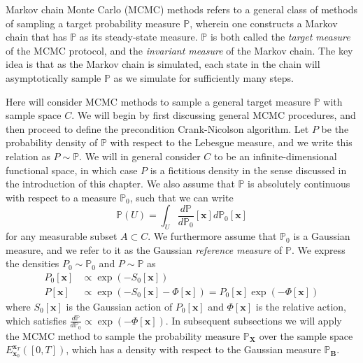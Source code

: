 Markov chain Monte Carlo (MCMC) methods refers to a general class of methods of sampling a target probability measure $\mathbb{P}$, wherein one constructs a Markov chain that has $\mathbb{P}$ as its steady-state measure. $\mathbb{P}$ is both called the \textit{target measure} of the MCMC protocol, and the \textit{invariant measure} of the Markov chain. The key idea is that as the Markov chain is simulated, each state in the chain will asymptotically sample $\mathbb{P}$ as we simulate for sufficiently many steps.

Here will consider MCMC methods to sample a general target measure $\mathbb{P}$ with sample space $C$. We will begin by first discussing general MCMC procedures, and then proceed to define the precondition Crank-Nicolson algorithm. Let $P$ be the probability density of $\mathbb{P}$ with respect to the Lebesgue measure, and we write this relation as $P \sim \mathbb{P}$. We will in general consider $C$ to be an infinite-dimensional functional space, in which case $P$ is a fictitious density in the sense discussed in the introduction of this chapter. We also assume that $\mathbb{P}$ is absolutely continuous with respect to a measure $\mathbb{P}_0$, such that we can write
\begin{equation} 
	\mathbb{P}(U) = \int_U \frac{d \mathbb{P}}{d \mathbb{P}_0}[\mathbf{x}] d \mathbb{P}_0[\mathbf{x}]
\end{equation}
for any measurable subset $A \subset C$. We furthermore assume that $\mathbb{P}_0$ is a Gaussian measure, and we refer to it as the Gaussian \textit{reference measure} of $\mathbb{P}$. We express the densities $P_0 \sim \mathbb{P}_0$ and $P \sim \mathbb{P}$ as
\begin{subequations}
\begin{align}
	P_0[\mathbf{x}] & \propto \exp ( -S_0[\mathbf{x}] ) \\
	P[\mathbf{x}] & \propto \exp (  -S_0[\mathbf{x}] - \Phi[\mathbf{x}] ) = P_0[\mathbf{x}] \exp ( - \Phi[\mathbf{x}] )
\end{align}
\end{subequations}
where $S_0[\mathbf{x}]$ is the Gaussian action of $P_0[\mathbf{x}]$ and $\Phi[\mathbf{x}]$ is the relative action, which satisfies $\frac{d \mathbb{P}}{d \mathbb{P}_0} \propto \exp( - \Phi[\mathbf{x}] )$. In subsequent subsections we will apply the MCMC method to sample the probability measure $\mathbb{P}_\mathbf{X}$ over the sample space $E_{\mathbf{x}_0}^{\mathbf{x}_T}([0,T])$, which has a density with respect to the Gaussian measure $\mathbb{P}_\mathbf{B}$.

